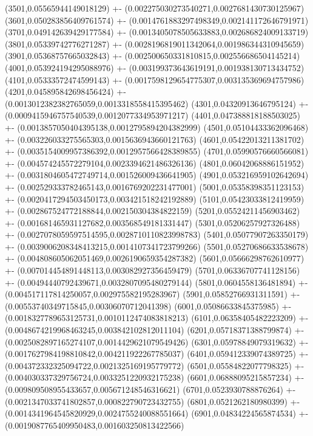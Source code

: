 {(3501,0.05565944149018129) +- (0.002275030273540271,0.0027681430730125967)
(3601,0.050283856409761574) +- (0.0014761883297498349,0.002141172646791971)
(3701,0.049142639429177584) +- (0.0013405078505633883,0.002686824009133719)
(3801,0.05339742776271287) +- (0.0028196819011342064,0.001986344310945659)
(3901,0.05368757665032843) +- (0.002500650331810815,0.002556686504145214)
(4001,0.053924194295088976) +- (0.003199373643619191,0.001938130713434752)
(4101,0.05333572474599143) +- (0.0017598129654775307,0.003135369694757986)
(4201,0.045895842698456424) +- (0.0013012382382765059,0.0013318558415395462)
(4301,0.04320913646795124) +- (0.0009415946757540539,0.0012077334953971217)
(4401,0.047388818188503025) +- (0.0013857050404395138,0.0012795894204382999)
(4501,0.05104433362096468) +- (0.003226033275565303,0.0015636943660121763)
(4601,0.05422013211381702) +- (0.0035154009957386392,0.0012957566428389855)
(4701,0.05990576660566081) +- (0.004574245572279104,0.0023394621486326136)
(4801,0.06042068886151952) +- (0.0031804605472749714,0.001526009436641905)
(4901,0.053216959102642694) +- (0.002529333782465143,0.0016769202231477001)
(5001,0.05358398351123153) +- (0.0020417294503450173,0.003421518242192889)
(5101,0.05423033812419959) +- (0.002867524772188844,0.002150304384822159)
(5201,0.05524211456903462) +- (0.001681465931127682,0.003568549181331447)
(5301,0.05206257927326488) +- (0.0027078059597514595,0.0028710110823998783)
(5401,0.05077907263350179) +- (0.0039006208348413215,0.0014107341723799266)
(5501,0.05270686633538678) +- (0.004808605062051469,0.0026190659354287382)
(5601,0.05666298762610977) +- (0.007014454891448113,0.003082927356459479)
(5701,0.06336707741128156) +- (0.00494440792439671,0.0032807095480279144)
(5801,0.0604558136481894) +- (0.004517117814250057,0.002975582195283967)
(5901,0.05852766931311591) +- (0.00553740349715845,0.00306070712041398)
(6001,0.05086633845375985) +- (0.0018327789653125731,0.0010112474083818213)
(6101,0.06358405482223209) +- (0.0048674219968463245,0.003842102812011104)
(6201,0.05718371388799874) +- (0.0025082897165274107,0.0014429621079549426)
(6301,0.05978849079319632) +- (0.0017627984198810842,0.004211922267785037)
(6401,0.059412339074389725) +- (0.004372332325094722,0.0021325169195779772)
(6501,0.05584822077798325) +- (0.004030337329756724,0.0033251220932175238)
(6601,0.06888095215857234) +- (0.009809508955433657,0.005671248546316621)
(6701,0.0523930788876264) +- (0.0021347033741802857,0.000822790723432755)
(6801,0.0521262180980399) +- (0.0014341964545820929,0.0024755240088551664)
(6901,0.04834224565874534) +- (0.0019087765409950483,0.001603250813422566)
}
